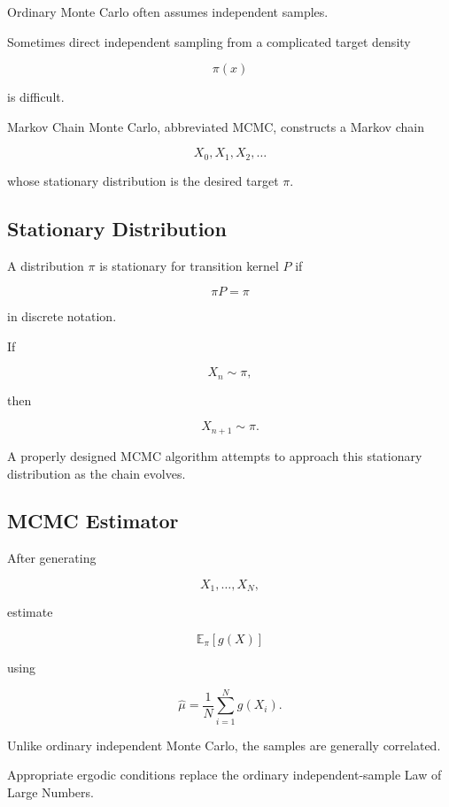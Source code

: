 Ordinary Monte Carlo often assumes independent samples.

Sometimes direct independent sampling from a complicated target density

\[
\pi(x)
\]

is difficult.

Markov Chain Monte Carlo, abbreviated MCMC, constructs a Markov chain

\[
X_0,X_1,X_2,\ldots
\]

whose stationary distribution is the desired target \(\pi\).

\subsection{Stationary Distribution}
\label{subsec:mcmc-stationary-distribution}

A distribution \(\pi\) is stationary for transition kernel \(P\) if

\[
\boxed{
\pi P=\pi
}
\]

in discrete notation.

If

\[
X_n\sim\pi,
\]

then

\[
X_{n+1}\sim\pi.
\]

A properly designed MCMC algorithm attempts to approach this stationary
distribution as the chain evolves.

\subsection{MCMC Estimator}
\label{subsec:mcmc-estimator}

After generating

\[
X_1,\ldots,X_N,
\]

estimate

\[
\mathbb{E}_\pi[g(X)]
\]

using

\[
\boxed{
\widehat{\mu}
=
\frac1N
\sum_{i=1}^{N}
g(X_i).
}
\]

Unlike ordinary independent Monte Carlo, the samples are generally
correlated.

Appropriate ergodic conditions replace the ordinary independent-sample
Law of Large Numbers.

